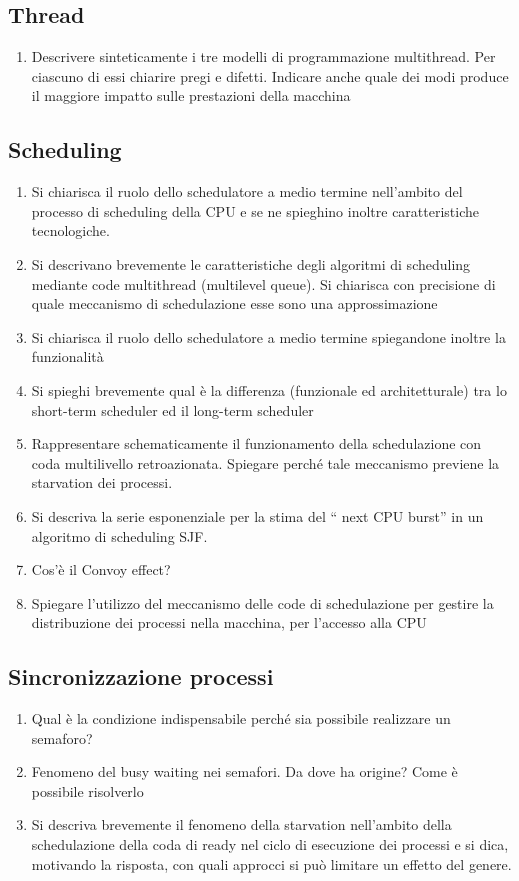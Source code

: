 \documentclass{report}
\begin{document}
\subsection{Thread}
\begin{enumerate}
    \item Descrivere sinteticamente i tre modelli di programmazione multithread. Per ciascuno di essi
chiarire pregi e difetti. Indicare anche quale dei modi produce il maggiore impatto sulle prestazioni della macchina
\end{enumerate}

\subsection{Scheduling}
\begin{enumerate}
    \item Si chiarisca il ruolo dello schedulatore a medio termine nell’ambito del processo di scheduling della CPU e se ne spieghino inoltre caratteristiche tecnologiche.
    \item Si descrivano brevemente le caratteristiche degli algoritmi di scheduling mediante code
multithread (multilevel queue). Si chiarisca con precisione di quale meccanismo di schedulazione esse sono una approssimazione
\item Si chiarisca il ruolo dello schedulatore a medio termine spiegandone inoltre la funzionalità
\item Si spieghi brevemente qual è la differenza (funzionale ed architetturale) tra lo short-term scheduler ed il long-term scheduler
\item Rappresentare schematicamente il funzionamento della schedulazione con coda multilivello retroazionata. Spiegare perché tale meccanismo previene la starvation dei processi.
\item Si descriva la serie esponenziale per la stima del “ next CPU burst” in un algoritmo di scheduling SJF.
\item Cos’è il Convoy effect?
\item Spiegare l’utilizzo del meccanismo delle code di schedulazione per gestire la distribuzione dei processi nella macchina, per l’accesso alla CPU
\end{enumerate}
\subsection{Sincronizzazione processi}
\begin{enumerate}
    \item Qual è la condizione indispensabile perché sia possibile realizzare un semaforo?
    \item Fenomeno del busy waiting nei semafori. Da dove ha origine? Come è possibile risolverlo
    \item Si descriva brevemente il fenomeno della starvation nell’ambito della schedulazione della coda di
ready nel ciclo di esecuzione dei processi e si dica, motivando la risposta, con quali approcci si può limitare un effetto del genere.
\end{enumerate}
\end{document}
